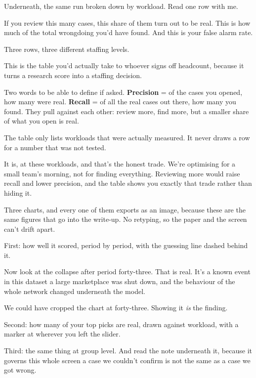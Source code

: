 \documentclass[11pt]{article}
\begin{document}
\begin{saythis}
Underneath, the same run broken down by workload. Read one row with me.

If you review this many cases, this share of them turn out to be real. This is
how much of the total wrongdoing you'd have found. And this is your false
alarm rate.

Three rows, three different staffing levels.

This is the table you'd actually take to whoever signs off headcount, because
it turns a research score into a staffing decision.
\end{saythis}

\begin{means}
Two words to be able to define if asked. \textbf{Precision} = of the cases you
opened, how many were real. \textbf{Recall} = of all the real cases out there,
how many you found. They pull against each other: review more, find more, but a
smaller share of what you open is real.

The table only lists workloads that were actually measured. It never draws a
row for a number that was not tested.
\end{means}

\begin{asked}
 It is, at these workloads, and that's the honest
trade. We're optimising for a small team's morning, not for finding everything.
Reviewing more would raise recall and lower precision, and the table shows you
exactly that trade rather than hiding it.
\end{asked}


\begin{saythis}
Three charts, and every one of them exports as an image, because these are the
same figures that go into the write-up. No retyping, so the paper and the
screen can't drift apart.

First: how well it scored, period by period, with the guessing line dashed
behind it.

Now look at the collapse after period forty-three. That is real. It's a known
event in this dataset \bt a large marketplace was shut down, and the behaviour
of the whole network changed underneath the model.

We could have cropped the chart at forty-three. Showing it \emph{is} the
finding.

Second: how many of your top picks are real, drawn against workload, with a
marker at wherever you left the slider.

Third: the same thing at group level. And read the note underneath it, because
it governs this whole screen \bt a case we couldn't confirm is not the same as
a case we got wrong.
\end{saythis}
\end{document}
